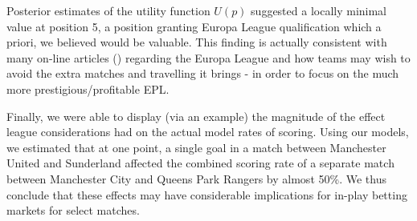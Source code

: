 Posterior estimates of the utility function \(U(p)\) suggested a locally minimal value at position 5, a position
granting Europa League qualification which a priori, we believed would be valuable. This finding is actually consistent
with many on-line articles (\cite{raceToAvoidEurope, battleToAvoidEurople, spursAvoidEurople}) regarding the Europa
League and how teams may wish to avoid the extra matches and travelling it brings - in order to focus on the much more
prestigious/profitable \gls{EPL}.

Finally, we were able to display (via an example) the magnitude of the effect league considerations had on the actual
model rates of scoring. Using our models, we estimated that at one point, a single goal in a match between Manchester
United and Sunderland affected the combined scoring rate of a separate match between Manchester City and Queens Park
Rangers by almost 50\%. We thus conclude that these effects may have considerable implications for in-play betting
markets for select matches.





